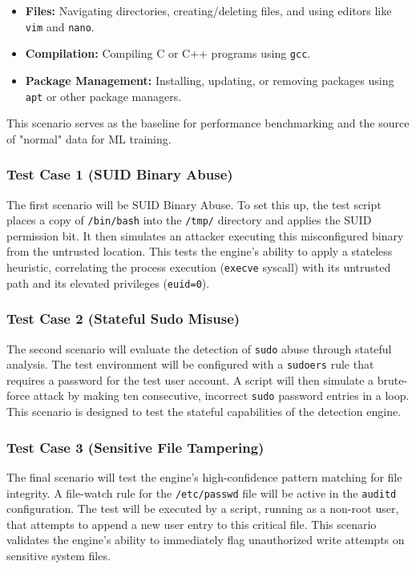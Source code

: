 \documentclass[journal]{./IEEEtran}
\begin{document}
\begin{itemize}
    \item \textbf{Files:} Navigating directories, creating/deleting files, and using editors like \texttt{vim} and \texttt{nano}.
    \item \textbf{Compilation:} Compiling C or C++ programs using \texttt{gcc}.
    \item \textbf{Package Management:} Installing, updating, or removing packages using \texttt{apt} or other package managers.
\end{itemize}
This scenario serves as the baseline for performance benchmarking and the source of "normal" data for ML training.

\subsubsection{\textbf{Test Case 1 (SUID Binary Abuse)}}
The first scenario will be SUID Binary Abuse. To set this up, the test script places a copy of \texttt{/bin/bash} into the \texttt{/tmp/} directory and applies the SUID permission bit. It then simulates an attacker executing this misconfigured binary from the untrusted location. This tests the engine's ability to apply a stateless heuristic, correlating the process execution (\texttt{execve} syscall) with its untrusted path and its elevated privileges (\texttt{euid=0}).

\subsubsection{\textbf{Test Case 2 (Stateful Sudo Misuse)}}
The second scenario will evaluate the detection of \texttt{sudo} abuse through stateful analysis. The test environment will be configured with a \texttt{sudoers} rule that requires a password for the test user account. A script will then simulate a brute-force attack by making ten consecutive, incorrect \texttt{sudo} password entries in a loop. This scenario is designed to test the stateful capabilities of the detection engine.

\subsubsection{\textbf{Test Case 3 (Sensitive File Tampering)}}
The final scenario will test the engine's high-confidence pattern matching for file integrity. A file-watch rule for the \texttt{/etc/passwd} file will be active in the \texttt{auditd} configuration. The test will be executed by a script, running as a non-root user, that attempts to append a new user entry to this critical file. This scenario validates the engine's ability to immediately flag unauthorized write attempts on sensitive system files.
\end{document}
